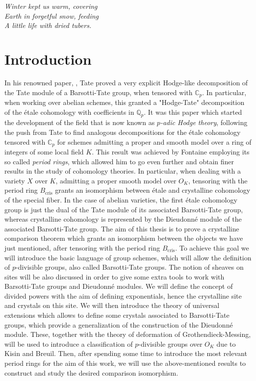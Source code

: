 \begin{flushright}
	\emph{Winter kept us warm, covering\\
	Earth in forgetful snow, feeding\\
	A little life with dried tubers.}\\
\end{flushright} 
\newpage

{}
\section*{Introduction}
In his renowned paper, \cite{TatePC}, Tate proved a very explicit Hodge-like decomposition
of the Tate module of a Barsotti-Tate group, when tensored with $\mathbb{C}_p$.
In particular, when working over abelian schemes, this granted a "Hodge-Tate"
decomposition of the étale cohomology with coefficients in $\mathbb{Q}_p$.
It was this paper which started the development of the field that is now known as \emph{$p$-adic Hodge theory},
following the push from Tate to find analogous decompositions for the étale cohomology
tensored with $\mathbb{C}_p$ for schemes admitting a proper and smooth model over
a ring of integers of some local field $K$.
This result was achieved by Fontaine employing its so called \emph{period rings},
which allowed him to go even further and obtain finer results in the
study of cohomology theories.
In particular, when dealing with a variety $X$ over $K$, admitting
a proper smooth model over $O_K$, tensoring with the period ring $B_{\mathrm{cris}}$
grants an isomorphism between étale and crystalline cohomology of the special fiber.
In the case of abelian varieties, the first étale cohomology group is just the dual
of the Tate module of its associated Barsotti-Tate group,
whereas crystalline cohomology is represented by the Dieudonné module
of the associated Barsotti-Tate group.
The aim of this thesis is to prove a crystalline comparison theorem which
grants an isomorphism between the objects we have just mentioned, after tensoring
with the period ring $B_{\mathrm{cris}}$.
To achieve this goal we will introduce the basic language of group schemes, which
will allow the definition of $p$-divisible groups, also called Barsotti-Tate groups.
The notion of sheaves on sites will be also discussed in order to give some
extra tools to work with Barsotti-Tate groups and Dieudonné modules.
We will define the concept of divided powers with the aim
of defining exponentials, hence the crystalline site and crystals on this site.
We will then introduce the theory of universal extensions which allows
to define some crystals associated to Barsotti-Tate groups,
which provide a generalization of the construction of the Dieudonné module.
These, together with the theory of deformation of Grothendieck-Messing,
will be used to introduce a classification
of $p$-divisible groups over $O_K$ due to Kisin and Breuil.
Then, after spending some time to introduce the most relevant period rings
for the aim of this work, we will use the above-mentioned results
to construct and study the desired comparison isomorphism.




